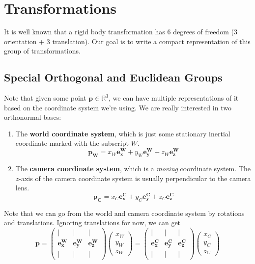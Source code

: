 \documentclass{article}
\theoremstyle{definition}
\theoremstyle{remark}
\theoremstyle{definition}
\begin{document}
\section{Transformations}

It is well known that a rigid body transformation has 6 degrees of freedom (3 orientation + 3 translation). Our goal is to write a compact representation of this group of transformations. 

\subsection{Special Orthogonal and Euclidean Groups}
Note that given some point $\mathbf{p} \in \mathbb{R}^3$, we can have multiple representations of it based on the coordinate system we're using. We are really interested in two orthonormal bases: 
\begin{enumerate}
    \item The \textbf{world coordinate system}, which is just some stationary inertial coordinate marked with the subscript $W$. 
    \[\mathbf{p_W} = x_W \mathbf{e_x^W} + y_W \mathbf{e_y^W} + z_W \mathbf{e_z^W} \] 
    
    \item The \textbf{camera coordinate system}, which is a \textit{moving} coordinate system. The $z$-axis of the camera coordinate system is usually perpendicular to the camera lens. 
    \[\mathbf{p_C} = x_C \mathbf{e_x^C} + y_C \mathbf{e_y^C} + z_C \mathbf{e_z^C} \] 
\end{enumerate}
Note that we can go from the world and camera coordinate system by rotations and translations. Ignoring translations for now, we can get 
\[ \mathbf{p} = \begin{pmatrix} | & | & | \\ \mathbf{e_x^W} & \mathbf{e_y^W} & \mathbf{e_z^W} \\ | & | & | \end{pmatrix} \begin{pmatrix} x_W \\ y_W \\ z_W \end{pmatrix} = \begin{pmatrix} | & | & | \\ \mathbf{e_x^C} & \mathbf{e_y^C} & \mathbf{e_z^C} \\ | & | & | \end{pmatrix} \begin{pmatrix} x_C \\ y_C \\ z_C \end{pmatrix} \]
\end{document}
